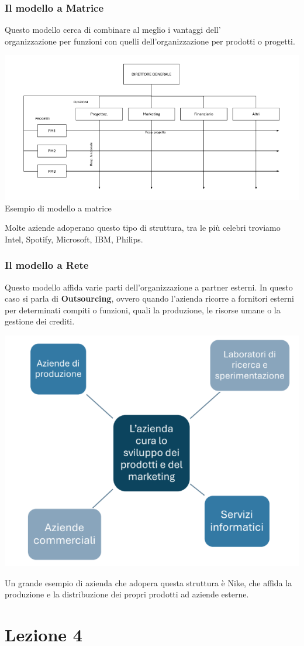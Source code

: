 \documentclass[14pt]{extarticle}
\begin{document}
\subsubsection{Il modello a Matrice}

Questo modello cerca di combinare al meglio i vantaggi dell' \\ 
organizzazione per funzioni con quelli dell'organizzazione per prodotti o
progetti.

\begin{center}
    \includegraphics[scale=0.60]{images/modello_matrice.png}
    Esempio di modello a matrice
\end{center}
Molte aziende adoperano questo tipo di struttura, tra le più celebri troviamo
Intel, Spotify, Microsoft, IBM, Philips.

\subsubsection{Il modello a Rete}

Questo modello affida varie parti dell'organizzazione a partner esterni. In
questo caso si parla di \textbf{Outsourcing}, ovvero quando l'azienda ricorre a
fornitori esterni per determinati compiti o funzioni, quali la produzione, le
risorse umane o la gestione dei crediti.

\begin{center}
    \includegraphics[scale=0.80]{images/modello_rete.png}
\end{center}
Un grande esempio di azienda che adopera questa struttura è Nike, che affida la produzione e la
distribuzione dei propri prodotti ad aziende esterne.

\section{Lezione 4}
\end{document}
